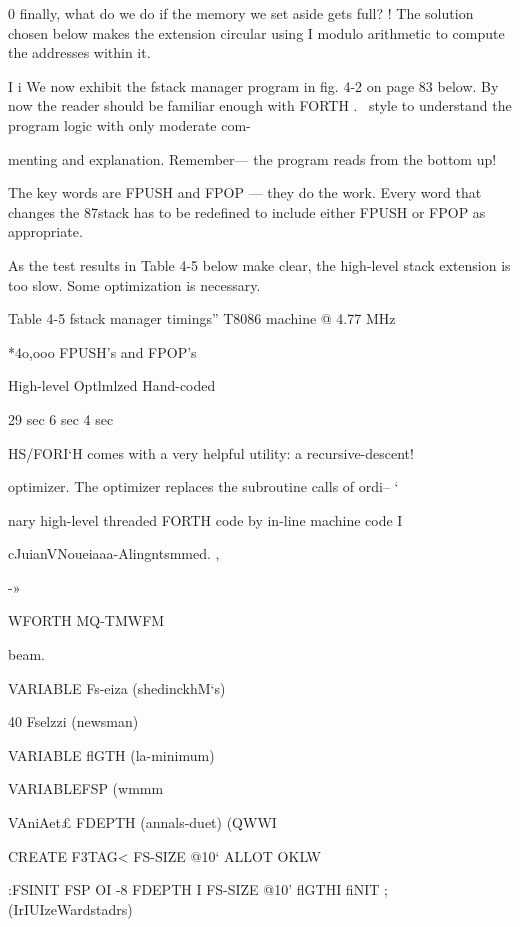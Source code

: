 {{{{{0 finally, what do we do if the memory we set aside gets full? !
The solution chosen below makes the extension circular using I
modulo arithmetic to compute the addresses within it.

I
i
We now exhibit the fstack manager program in fig. 4-2 on page 83
below. By now the reader should be familiar enough with FORTH .~
style to understand the program logic with only moderate com-

menting and explanation. Remember— the program reads from
the bottom up!

The key words are FPUSH and FPOP — they do the work. Every
word that changes the 87stack has to be redefined to include
either FPUSH or FPOP as appropriate.

As the test results in Table 4-5 below make clear, the high-level
stack extension is too slow. Some optimization is necessary.

Table 4-5 fstack manager timings”
T8086 machine @ 4.77 MHz

*4o,ooo FPUSH's and FPOP's

 

High-level Optlmlzed Hand-coded

29 sec 6 sec 4 sec

 

 

 

HS/FORI‘H comes with a very helpful utility: a recursive-descent!

optimizer. The optimizer replaces the subroutine calls of ordi-- ‘

nary high-level threaded FORTH code by in-line machine code I

cJuianVNoueiaaa-Alingntsmmed. ,

 

-»

 

WFORTH MQ-TMWFM

 

\noAnmmsermman

beam.

VARIABLE Fs-eiza (shedinckhM‘s)

40 Fselzzi (newsman)

VARIABLE flGTH (la-minimum)

VARIABLEFSP (wmmm

VAniAet£ FDEPTH (annals-duet)
(QWWI

CREATE F3TAG< FS-SIZE @10‘ ALLOT OKLW

:FSINIT FSP OI -8 FDEPTH I FS-SIZE @10'
flGTHI fiNIT ; (IrIUIzeWardstadrs)

}}}}}
